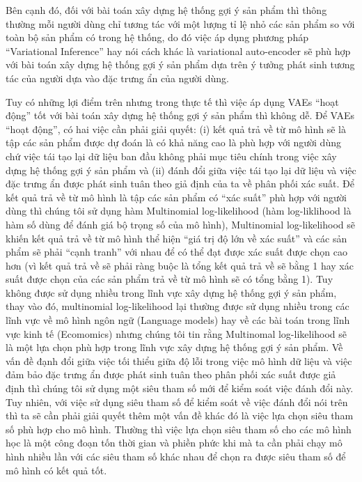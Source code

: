 Bên cạnh đó, đối với bài toán xây dựng hệ thống gợi ý sản phẩm thì thông thường mỗi người dùng chỉ tương tác với một lượng tỉ lệ nhỏ các sản phẩm so với toàn bộ sản phẩm có trong hệ thống, do đó việc áp dụng phương pháp ``Variational Inference'' hay nói cách khác là variational auto-encoder sẽ phù hợp với bài toán xây dựng hệ thống gợi ý sản phẩm dựa trên ý tưởng phát sinh tương tác của người dựa vào đặc trưng ẩn của người dùng. 

Tuy có những lợi điểm trên nhưng trong thực tế thì việc áp dụng VAEs ``hoạt động'' tốt với bài toán xây dựng hệ thống gợi ý sản phẩm thì không dễ.
Để VAEs ``hoạt động'', có hai việc cần phải giải quyết: (i) kết quả trả về từ mô hình sẽ là tập các sản phẩm được dự đoán là có khả năng cao là phù hợp với người dùng chứ việc tái tạo lại dữ liệu ban đầu không phải mục tiêu chính trong việc xây dựng hệ thống gợi ý sản phẩm và (ii) đánh đổi giữa việc tái tạo lại dữ liệu và việc đặc trưng ẩn được phát sinh tuân theo giả định của ta về phân phối xác suất.
Để kết quả trả về từ mô hình là tập các sản phẩm có ``xác suất'' phù hợp với người dùng thì chúng tôi sử dụng hàm Multinomial log-likelihood (hàm log-liklihood là hàm số dùng để đánh giá bộ trọng số của mô hình), Multinomial log-likelihood sẽ khiến kết quả trả về từ mô hình thể hiện ``giá trị độ lớn về xác suất'' và các sản phẩm sẽ phải ``cạnh tranh'' với nhau để có thể đạt được xác suất được chọn cao hơn (vì kết quả trả về sẽ phải ràng buộc là tổng kết quả trả về sẽ bằng 1 hay xác suất được chọn của các sản phẩm trả về từ mô hình sẽ có tổng bằng 1).
Tuy không được sử dụng nhiều trong lĩnh vực xây dựng hệ thống gợi ý sản phẩm, thay vào đó, multinomial log-likelihood lại thường được sử dụng nhiều trong các lĩnh vực về mô hình ngôn ngữ (Language models) hay về các bài toán trong lĩnh vực kinh tế (Ecomomics) nhưng chúng tôi tin rằng Multinomal log-likelihood sẽ là một lựa chọn phù hợp trong lĩnh vực xây dựng hệ thống gợi ý sản phẩm.
Về vấn đề đạnh đổi giữa việc tối thiểu giữa độ lỗi trong việc mô hình dữ liệu và việc đảm bảo đặc trưng ẩn được phát sinh tuân theo phân phối xác suất được giả định thì chúng tôi sử dụng một siêu tham số mới để kiểm soát việc đánh đổi này.
Tuy nhiên, với việc sử dụng siêu tham số để kiểm soát về việc đánh đổi nói trên thì ta sẽ cần phải giải quyết thêm một vấn đề khác đó là việc lựa chọn siêu tham số phù hợp cho mô hình.
Thường thì việc lựa chọn siêu tham số cho các mô hình học là một công đoạn tốn thời gian và phiền phức khi mà ta cần phải chạy mô hình nhiều lần với các siêu tham số khác nhau để chọn ra được siêu tham số để mô hình có kết quả tốt.
